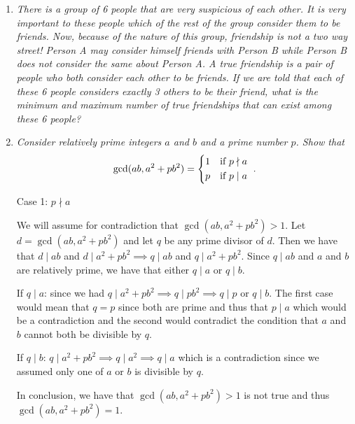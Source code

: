 \documentclass{article}
\begin{document}
\begin{enumerate}[1.]
\item %
{\itshape There is a group of 6 people that are very suspicious of each other. It is very important to these people which of the rest of the group consider them to be friends. Now, because of the nature of this group, friendship is not a two way street! Person A may consider himself friends with Person B while Person B does not consider the same about Person A. A true friendship is a pair of people who both consider each other to be friends. If we are told that each of these 6 people considers exactly 3 others to be their friend, what is the minimum and maximum number of true friendships that can exist among these 6 people?}


\item %
{\itshape Consider relatively prime integers $a$ and $b$ and a prime number $p$.
Show that
\[ \gcd(ab, a^2+pb^2) = \begin{cases*} 1 & if $p \nmid a$ \\ p & if $p \mid a$ \end{cases*}. \]}

Case 1: $p \nmid a$ \par
We will assume for contradiction that $\gcd(ab, a^2+pb^2) > 1$. Let $d = \gcd(ab, a^2+pb^2)$ and let $q$ be any prime divisor of $d$. 
Then we have that $d \mid ab$ and $d \mid a^2+pb^2 \implies q \mid ab$ and $q \mid a^2+pb^2$. Since $q \mid ab$ and $a$ and $b$ are relatively prime, we have that either $q \mid a$ or $q \mid b$. \par
If $q \mid a$: since we had $q \mid a^2 + pb^2 \implies q \mid pb^2 \implies q \mid p$ or $q \mid b$. The first case would mean that $q = p$ since both are prime and thus that $p \mid a$ which would be a contradiction and the second would contradict the condition that $a$ and $b$ cannot both be divisible by $q$. \par
If $q \mid b$: $q \mid a^2 + pb^2 \implies q \mid a^2 \implies q \mid a$ which is a contradiction since we assumed only one of $a$ or $b$ is divisible by $q$. \par
In conclusion, we have that $\gcd(ab, a^2+pb^2) > 1$ is not true and thus $\gcd(ab, a^2+pb^2) = 1.$ \newline


\end{enumerate}
\end{document}

